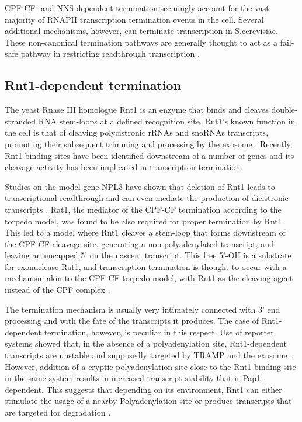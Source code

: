 CPF-CF- and NNS-dependent termination seemingly account for the vast majority of RNAPII transcription termination events in the cell.
Several additional mechanisms, however, can terminate transcription in S.cerevisiae. 
These non-canonical termination pathways are generally thought to act as a fail-safe pathway in restricting readthrough transcription \cite{colin:2014:roadblock,ghazal:2005:genomewide}.


\subsection{Rnt1-dependent termination}

The yeast Rnase III homologue Rnt1 is an enzyme that binds and cleaves double-stranded RNA stem-loops at a defined recognition site. 
Rnt1’s known function in the cell is that of cleaving polycistronic rRNAs and snoRNAs transcripts, promoting their subsequent trimming and processing by the exosome \cite{ghazal:2005:genomewide}. 
Recently, Rnt1 binding sites have been identified downstream of a number of genes and its cleavage activity has been implicated in transcription termination.

Studies on the model gene NPL3 have shown that deletion of Rnt1 leads to transcriptional readthrough and can even mediate the production of dicistronic transcripts \cite{ghazal:2009:yeast}. 
Rat1, the mediator of the CPF-CF termination according to the torpedo model, was found to be also required for proper termination by Rnt1. 
This led to a model where Rnt1 cleaves a stem-loop that forms downstream of the CPF-CF cleavage site, generating a non-polyadenylated transcript, and leaving an uncapped 5’ on the nascent transcript. 
This free 5’-OH is a substrate for exonuclease Rat1, and transcription termination is thought to occur with a mechanism akin to the CPF-CF torpedo model, with Rnt1 as the cleaving agent instead of the CPF complex  \cite{ghazal:2009:yeast, rondo:2009:failsafe}.

The termination mechanism is usually very intimately connected with 3’ end processing and with the fate of the transcripts it produces. The case of Rnt1-dependent termination, however, is peculiar in this respect.
Use of \invivo{} reporter systems showed that, in the absence of a polyadenylation site, Rnt1-dependent transcripts are unstable and supposedly targeted by TRAMP and the exosome \cite{ghazal:2009:yeast}. 
However, addition of a cryptic polyadenylation site close to the Rnt1 binding site in the same system results in increased transcript stability that is Pap1-dependent. 
This suggests that depending on its environment, Rnt1 can either stimulate the usage of a nearby Polyadenylation site or produce transcripts that are targeted for degradation \cite{rondo:2009:failsafe}.


